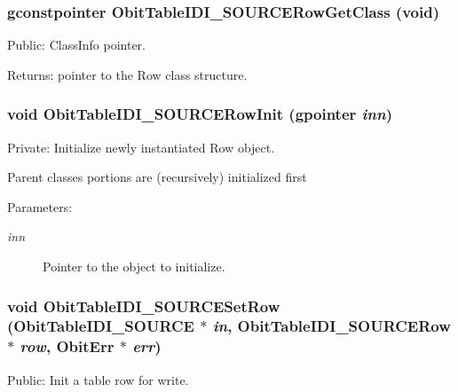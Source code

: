 \subsubsection{\setlength{\rightskip}{0pt plus 5cm}gconstpointer Obit\-Table\-IDI\_\-SOURCERow\-Get\-Class (void)}\label{ObitTableIDI__SOURCE_8c_a15}


Public: Class\-Info pointer. 

\begin{Desc}
\item[Returns:]pointer to the Row class structure. \end{Desc}
\subsubsection{\setlength{\rightskip}{0pt plus 5cm}void Obit\-Table\-IDI\_\-SOURCERow\-Init (gpointer {\em inn})}\label{ObitTableIDI__SOURCE_8c_a6}


Private: Initialize newly instantiated Row object. 

Parent classes portions are (recursively) initialized first \begin{Desc}
\item[Parameters:]
\begin{description}
\item[{\em inn}]Pointer to the object to initialize. \end{description}
\end{Desc}
\subsubsection{\setlength{\rightskip}{0pt plus 5cm}void Obit\-Table\-IDI\_\-SOURCESet\-Row ({\bf Obit\-Table\-IDI\_\-SOURCE} $\ast$ {\em in}, {\bf Obit\-Table\-IDI\_\-SOURCERow} $\ast$ {\em row}, {\bf Obit\-Err} $\ast$ {\em err})}\label{ObitTableIDI__SOURCE_8c_a23}


Public: Init a table row for write. 

